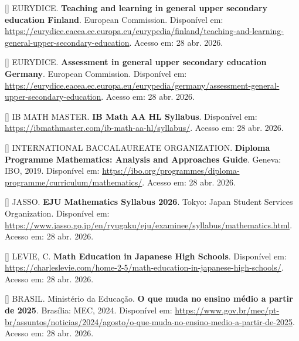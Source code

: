 \documentclass[12pt,a4paper,oneside]{article}
\begin{document}
\begin{singlespace}
\noindent\hangindent=1.25cm
[\theequation\label{ref:eurydice-finland}]
EURYDICE. \textbf{Teaching and learning in general upper secondary
education \textendash{} Finland}. European Commission. Disponível
em:
\url{https://eurydice.eacea.ec.europa.eu/eurypedia/finland/teaching-and-learning-general-upper-secondary-education}.
Acesso em: 28 abr. 2026.\par\smallskip

\noindent\hangindent=1.25cm
[\theequation\label{ref:eurydice-germany}]
EURYDICE. \textbf{Assessment in general upper secondary education
\textendash{} Germany}. European Commission. Disponível em:
\url{https://eurydice.eacea.ec.europa.eu/eurypedia/germany/assessment-general-upper-secondary-education}.
Acesso em: 28 abr. 2026.\par\smallskip

\noindent\hangindent=1.25cm
[\theequation\label{ref:ib-master}]
IB MATH MASTER. \textbf{IB Math AA HL Syllabus}. Disponível em:
\url{https://ibmathmaster.com/ib-math-aa-hl/syllabus/}. Acesso em:
28 abr. 2026.\par\smallskip

\noindent\hangindent=1.25cm
[\theequation\label{ref:ibo-aa}]
INTERNATIONAL BACCALAUREATE ORGANIZATION. \textbf{Diploma Programme
Mathematics: Analysis and Approaches Guide}. Geneva: IBO, 2019.
Disponível em:
\url{https://ibo.org/programmes/diploma-programme/curriculum/mathematics/}.
Acesso em: 28 abr. 2026.\par\smallskip

\noindent\hangindent=1.25cm
[\theequation\label{ref:jasso-eju}]
JASSO. \textbf{EJU Mathematics Syllabus 2026}. Tokyo: Japan Student
Services Organization. Disponível em:
\url{https://www.jasso.go.jp/en/ryugaku/eju/examinee/syllabus/mathematics.html}.
Acesso em: 28 abr. 2026.\par\smallskip

\noindent\hangindent=1.25cm
[\theequation\label{ref:levie-japan}]
LEVIE, C. \textbf{Math Education in Japanese High Schools}.
Disponível em:
\url{https://charleslevie.com/home-2-5/math-education-in-japanese-high-schools/}.
Acesso em: 28 abr. 2026.\par\smallskip

\noindent\hangindent=1.25cm
[\theequation\label{ref:mec-novo-em}]
BRASIL. Ministério da Educação. \textbf{O que muda no ensino médio
a partir de 2025}. Brasília: MEC, 2024. Disponível em:
\url{https://www.gov.br/mec/pt-br/assuntos/noticias/2024/agosto/o-que-muda-no-ensino-medio-a-partir-de-2025}.
Acesso em: 28 abr. 2026.\par\smallskip


\end{singlespace}
\end{document}
